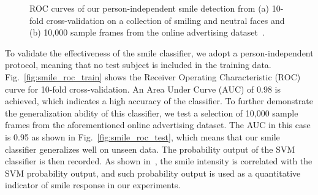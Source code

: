 \documentclass[twoside,leqno,twocolumn]{article}
\begin{document}
\begin{figure}[h]
\centering
\caption{ROC curves of our person-independent smile detection from (a) 10-fold cross-validation on a collection of smiling and neutral faces and (b) 10,000 sample frames from the online advertising dataset~\cite{Yang_FG15}.}
\end{figure}


To validate the effectiveness of the smile classifier, we adopt a person-independent protocol, meaning that no test subject is included in the training data. Fig.~\ref{fig:smile_roc_train} shows the Receiver Operating Characteristic (ROC) curve for 10-fold cross-validation. An Area Under Curve (AUC) of 0.98 is achieved, which indicates a high accuracy of the classifier. To further demonstrate the generalization ability of this classifier, we test a selection of 10,000 sample frames from the aforementioned online advertising dataset. The AUC in this case is 0.95 as shown in Fig.~\ref{fig:smile_roc_test}, which means that our smile classifier generalizes well on unseen data. The probability output of the SVM classifier is then recorded. As shown in~\cite{Yang_TAC14}, the smile intensity is correlated with the SVM probability output, and such probability output is used as a quantitative indicator of smile response in our experiments.
\end{document}
